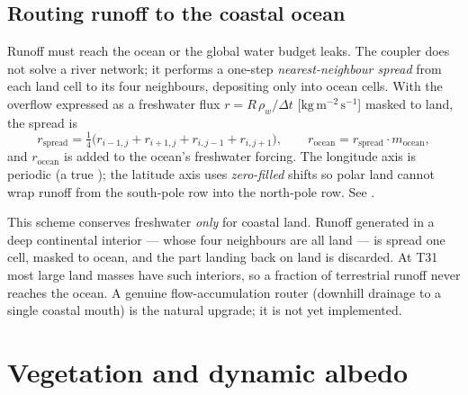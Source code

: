 \subsection{Routing runoff to the coastal ocean}

Runoff must reach the ocean or the global water budget leaks. The coupler does
not solve a river network; it performs a one-step \emph{nearest-neighbour
spread} from each land cell to its four neighbours, depositing only into ocean
cells. With the overflow expressed as a freshwater flux $r =
R\,\rho_w/\Delta t$ [$\mathrm{kg\,m^{-2}\,s^{-1}}$] masked to land, the spread is
\begin{equation}
  r_{\mathrm{spread}} = \tfrac14\bigl(r_{i-1,j} + r_{i+1,j} + r_{i,j-1} + r_{i,j+1}\bigr),
  \qquad
  r_{\mathrm{ocean}} = r_{\mathrm{spread}}\cdot m_{\mathrm{ocean}},
  \label{eq:route}
\end{equation}
and $r_{\mathrm{ocean}}$ is added to the ocean's freshwater forcing. The
longitude axis is periodic (a true ); the latitude axis uses
\emph{zero-filled} shifts so polar land cannot wrap runoff from the south-pole
row into the north-pole row. See
.

\begin{remark}
This scheme conserves freshwater \emph{only} for coastal land. Runoff generated
in a deep continental interior --- whose four neighbours are all land --- is
spread one cell, masked to ocean, and the part landing back on land is
discarded. At T31 most large land masses have such interiors, so a fraction of
terrestrial runoff never reaches the ocean. A genuine flow-accumulation router
(downhill drainage to a single coastal mouth) is the natural upgrade; it is not
yet implemented.
\end{remark}

\section{Vegetation and dynamic albedo}\label{sec:albedo}


